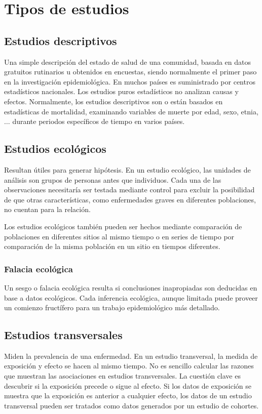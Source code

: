 \section{Tipos de estudios}
\subsection{Estudios descriptivos}
Una simple descripción del estado de salud de una comunidad, basada en datos gratuitos rutinarios u obtenidos en encuestas, siendo normalmente el primer paso en la investigación epidemiológica. En muchos países es suministrado por centros estadísticos nacionales. Los estudios puros estadísticos no analizan causas y efectos. Normalmente, los estudios descriptivos son o están basados en estadísticas de mortalidad, examinando variables de muerte por edad, sexo, etnia,$\dots$ durante periodos específicos de tiempo en varios países.
\subsection{Estudios ecológicos}
Resultan útiles para generar hipótesis. En un estudio ecológico, las unidades de análisis son grupos de personas antes que individuos. Cada una de las observaciones necesitaría ser testada mediante control para excluir la posibilidad de que otras características, como enfermedades graves en diferentes poblaciones, no cuentan para la relación.

Los estudios ecológicos también pueden ser hechos mediante comparación de poblaciones en diferentes sitios al mismo tiempo o en series de tiempo por comparación de la misma población en un sitio en tiempos diferentes.
\subsubsection{Falacia ecológica}
Un sesgo o falacia ecológica resulta si conclusiones inapropiadas son deducidas en base a datos ecológicos. Cada inferencia ecológica, aunque limitada puede proveer un comienzo fructífero para un trabajo epidemiológico más detallado.
\subsection{Estudios transversales}
Miden la prevalencia de una enfermedad. En un estudio transversal, la medida de exposición y efecto se hacen al mismo tiempo. No es sencillo calcular las razones que muestran las asociaciones en estudios transversales. La cuestión clave es descubrir si la exposición precede o sigue al efecto. Si los datos de exposición se muestra que la exposición es anterior a cualquier efecto, los datos de un estudio transversal pueden ser tratados como datos generados por un estudio de cohortes.

